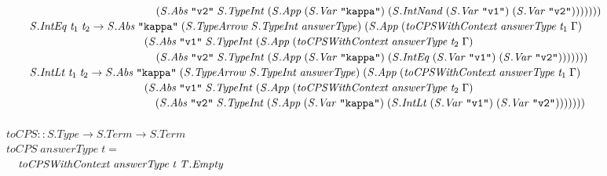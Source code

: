 \documentclass[10pt]{article}
\newcommand{\Conid}[1]{\mathit{#1}}
\newcommand{\Varid}[1]{\mathit{#1}}
\begin{document}
\begin{hscode}
${\hskip1.00em\relax\hskip1.00em\relax\hskip10.50em\relax\hskip1.00em\relax(\Conid{\Conid{S}.Abs}\;\text{\tt \char34 v2\char34}\;\Conid{\Conid{S}.TypeInt}\;(\Conid{\Conid{S}.App}\;(\Conid{\Conid{S}.Var}\;\text{\tt \char34 kappa\char34})\;(\Conid{\Conid{S}.IntNand}\;(\Conid{\Conid{S}.Var}\;\text{\tt \char34 v1\char34})\;(\Conid{\Conid{S}.Var}\;\text{\tt \char34 v2\char34})))))))}$\\
${\hskip1.00em\relax\hskip1.00em\relax\Conid{\Conid{S}.IntEq}\;\Varid{t}_{1}\;\Varid{t}_{2}\to \Conid{\Conid{S}.Abs}\;\text{\tt \char34 kappa\char34}\;(\Conid{\Conid{S}.TypeArrow}\;\Conid{\Conid{S}.TypeInt}\;\Varid{answerType})\;(\Conid{\Conid{S}.App}\;(\Varid{toCPSWithContext}\;\Varid{answerType}\;\Varid{t}_{1}\;\Gamma)}$\\
${\hskip1.00em\relax\hskip1.00em\relax\hskip10.50em\relax(\Conid{\Conid{S}.Abs}\;\text{\tt \char34 v1\char34}\;\Conid{\Conid{S}.TypeInt}\;(\Conid{\Conid{S}.App}\;(\Varid{toCPSWithContext}\;\Varid{answerType}\;\Varid{t}_{2}\;\Gamma)}$\\
${\hskip1.00em\relax\hskip1.00em\relax\hskip10.50em\relax\hskip1.00em\relax(\Conid{\Conid{S}.Abs}\;\text{\tt \char34 v2\char34}\;\Conid{\Conid{S}.TypeInt}\;(\Conid{\Conid{S}.App}\;(\Conid{\Conid{S}.Var}\;\text{\tt \char34 kappa\char34})\;(\Conid{\Conid{S}.IntEq}\;(\Conid{\Conid{S}.Var}\;\text{\tt \char34 v1\char34})\;(\Conid{\Conid{S}.Var}\;\text{\tt \char34 v2\char34})))))))}$\\
${\hskip1.00em\relax\hskip1.00em\relax\Conid{\Conid{S}.IntLt}\;\Varid{t}_{1}\;\Varid{t}_{2}\to \Conid{\Conid{S}.Abs}\;\text{\tt \char34 kappa\char34}\;(\Conid{\Conid{S}.TypeArrow}\;\Conid{\Conid{S}.TypeInt}\;\Varid{answerType})\;(\Conid{\Conid{S}.App}\;(\Varid{toCPSWithContext}\;\Varid{answerType}\;\Varid{t}_{1}\;\Gamma)}$\\
${\hskip1.00em\relax\hskip1.00em\relax\hskip10.50em\relax(\Conid{\Conid{S}.Abs}\;\text{\tt \char34 v1\char34}\;\Conid{\Conid{S}.TypeInt}\;(\Conid{\Conid{S}.App}\;(\Varid{toCPSWithContext}\;\Varid{answerType}\;\Varid{t}_{2}\;\Gamma)}$\\
${\hskip1.00em\relax\hskip1.00em\relax\hskip10.50em\relax\hskip1.00em\relax(\Conid{\Conid{S}.Abs}\;\text{\tt \char34 v2\char34}\;\Conid{\Conid{S}.TypeInt}\;(\Conid{\Conid{S}.App}\;(\Conid{\Conid{S}.Var}\;\text{\tt \char34 kappa\char34})\;(\Conid{\Conid{S}.IntLt}\;(\Conid{\Conid{S}.Var}\;\text{\tt \char34 v1\char34})\;(\Conid{\Conid{S}.Var}\;\text{\tt \char34 v2\char34})))))))}$\\
${}$\\
${\Varid{toCPS}\mathbin{::}\Conid{\Conid{S}.Type}\to \Conid{\Conid{S}.Term}\to \Conid{\Conid{S}.Term}}$\\
${\Varid{toCPS}\;\Varid{answerType}\;\Varid{t}\mathrel{=}}$\\
${\hskip1.00em\relax\Varid{toCPSWithContext}\;\Varid{answerType}\;\Varid{t}\;\Conid{\Conid{T}.Empty}}$\ColumnHook
\end{hscode}\resethooks
\end{document}
